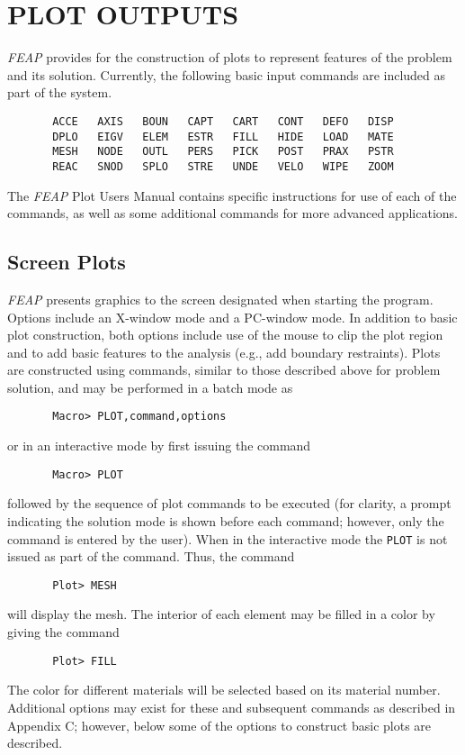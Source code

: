 \chapter[Plot Outputs]{PLOT OUTPUTS}
\label{plot}

{\sl FEAP} provides for the construction of plots to represent features of
the problem and its solution.  Currently, the following basic input
commands are included as part of the system.
\begin{verbatim}
       ACCE   AXIS   BOUN   CAPT   CART   CONT   DEFO   DISP
       DPLO   EIGV   ELEM   ESTR   FILL   HIDE   LOAD   MATE
       MESH   NODE   OUTL   PERS   PICK   POST   PRAX   PSTR
       REAC   SNOD   SPLO   STRE   UNDE   VELO   WIPE   ZOOM
\end{verbatim}
The {\sl FEAP} Plot Users Manual contains specific instructions for use of
each of the commands, as well as some additional commands for more
advanced applications.

\section{Screen Plots}
\label{screen}

{\sl FEAP} presents graphics to the screen designated when starting the program.
Options include an X-window mode and a PC-window mode.  In addition to
basic plot construction, both options include use of the mouse
to clip the plot region and to add basic features to the analysis (e.g., add
boundary restraints). Plots are constructed using commands,
similar to those described above for problem solution, and
may be performed in a batch mode as
\begin{verbatim}
       Macro> PLOT,command,options
\end{verbatim}
or in an interactive mode by first issuing the command
\begin{verbatim}
       Macro> PLOT
\end{verbatim}
followed by the sequence of plot commands to be executed
(for clarity, a prompt indicating the solution mode is shown before each
command; however, only the command is entered by the user).  When in the
interactive mode the {\tt PLOT} is not issued as part of the command.
Thus, the command
\begin{verbatim}
       Plot> MESH
\end{verbatim}
will display the mesh. The interior of each element may be filled in a color
by giving the command
\begin{verbatim}
       Plot> FILL
\end{verbatim}
The color for different materials will be selected based on its material number.
Additional options may exist for these and subsequent commands as described in
Appendix C; however, below some of the options to construct basic plots are
described.


